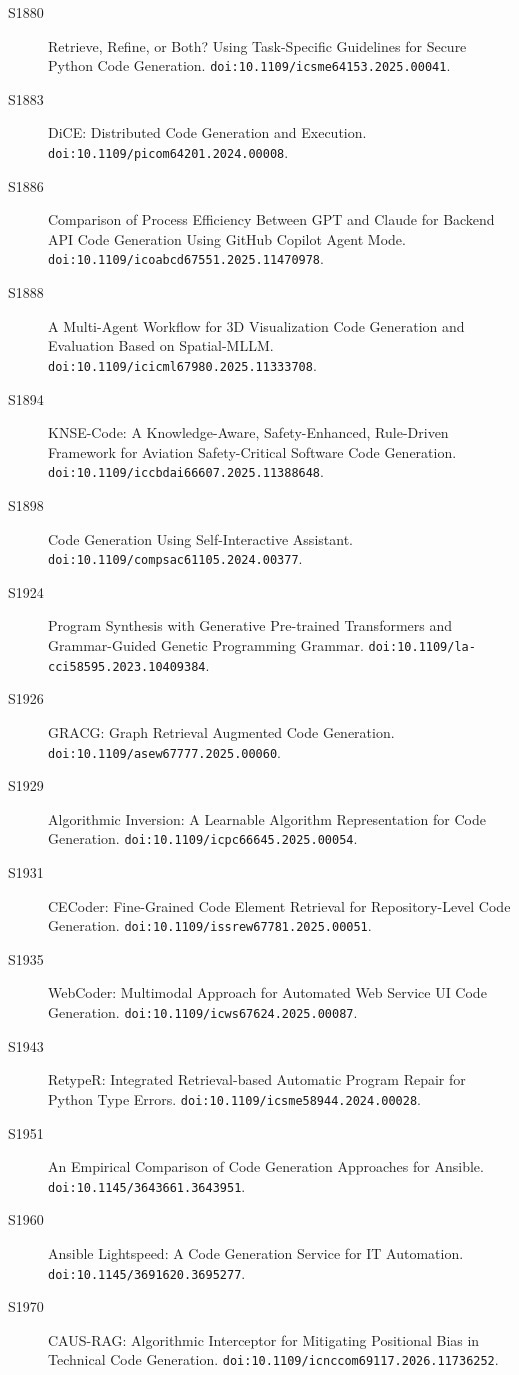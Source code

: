 {\begin{description}
\item[S1880] Retrieve, Refine, or Both? Using Task-Specific Guidelines for Secure Python Code Generation. \texttt{doi:10.1109/icsme64153.2025.00041}.
\item[S1883] DiCE: Distributed Code Generation and Execution. \texttt{doi:10.1109/picom64201.2024.00008}.
\item[S1886] Comparison of Process Efficiency Between GPT and Claude for Backend API Code Generation Using GitHub Copilot Agent Mode. \texttt{doi:10.1109/icoabcd67551.2025.11470978}.
\item[S1888] A Multi-Agent Workflow for 3D Visualization Code Generation and Evaluation Based on Spatial-MLLM. \texttt{doi:10.1109/icicml67980.2025.11333708}.
\item[S1894] KNSE-Code: A Knowledge-Aware, Safety-Enhanced, Rule-Driven Framework for Aviation Safety-Critical Software Code Generation. \texttt{doi:10.1109/iccbdai66607.2025.11388648}.
\item[S1898] Code Generation Using Self-Interactive Assistant. \texttt{doi:10.1109/compsac61105.2024.00377}.
\item[S1924] Program Synthesis with Generative Pre-trained Transformers and Grammar-Guided Genetic Programming Grammar. \texttt{doi:10.1109/la-cci58595.2023.10409384}.
\item[S1926] GRACG: Graph Retrieval Augmented Code Generation. \texttt{doi:10.1109/asew67777.2025.00060}.
\item[S1929] Algorithmic Inversion: A Learnable Algorithm Representation for Code Generation. \texttt{doi:10.1109/icpc66645.2025.00054}.
\item[S1931] CECoder: Fine-Grained Code Element Retrieval for Repository-Level Code Generation. \texttt{doi:10.1109/issrew67781.2025.00051}.
\item[S1935] WebCoder: Multimodal Approach for Automated Web Service UI Code Generation. \texttt{doi:10.1109/icws67624.2025.00087}.
\item[S1943] RetypeR: Integrated Retrieval-based Automatic Program Repair for Python Type Errors. \texttt{doi:10.1109/icsme58944.2024.00028}.
\item[S1951] An Empirical Comparison of Code Generation Approaches for Ansible. \texttt{doi:10.1145/3643661.3643951}.
\item[S1960] Ansible Lightspeed: A Code Generation Service for IT Automation. \texttt{doi:10.1145/3691620.3695277}.
\item[S1970] CAUS-RAG: Algorithmic Interceptor for Mitigating Positional Bias in Technical Code Generation. \texttt{doi:10.1109/icnccom69117.2026.11736252}.

\end{description}}
